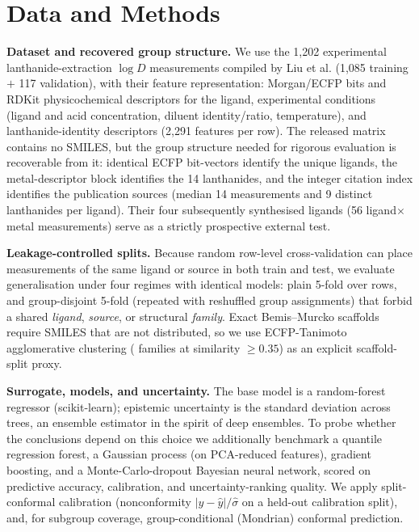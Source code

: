 \documentclass[journal=acsodf,manuscript=article]{achemso}
\begin{document}
\section{Data and Methods}
\textbf{Dataset and recovered group structure.} We use the 1{,}202 experimental
lanthanide-extraction $\log D$ measurements compiled by Liu et
al.\cite{Liu_2022} (1{,}085 training $+$ 117 validation), with their feature
representation: Morgan/ECFP bits and RDKit physicochemical descriptors for the
ligand, experimental conditions (ligand and acid concentration, diluent
identity/ratio, temperature), and lanthanide-identity descriptors (2{,}291 features
per row). The released matrix contains no SMILES, but the group structure needed for
rigorous evaluation is recoverable from it: identical ECFP bit-vectors identify the
\nLigands{} unique ligands, the metal-descriptor block identifies the 14 lanthanides,
and the integer citation index identifies the \nSources{} publication sources (median
14 measurements and 9 distinct lanthanides per ligand). Their four subsequently
synthesised ligands (56 ligand$\times$metal measurements) serve as a strictly
prospective external test.

\textbf{Leakage-controlled splits.} Because random row-level cross-validation can
place measurements of the same ligand or source in both train and test, we evaluate
generalisation under four regimes with identical models: plain 5-fold over rows, and
group-disjoint 5-fold (repeated with reshuffled group assignments) that forbid a
shared \emph{ligand}, \emph{source}, or structural \emph{family}. Exact Bemis--Murcko
scaffolds require SMILES that are not distributed, so we use ECFP-Tanimoto
agglomerative clustering (\nFamilies{} families at similarity $\ge 0.35$) as an
explicit scaffold-split proxy.

\textbf{Surrogate, models, and uncertainty.} The base model is a random-forest
regressor\cite{Breiman_2001} (scikit-learn\cite{Pedregosa_2011}); epistemic
uncertainty is the standard deviation across trees, an ensemble estimator in the
spirit of deep ensembles.\cite{Lakshminarayanan_2017,Scalia_2020,Hirschfeld_2020} To
probe whether the conclusions depend on this choice we additionally benchmark a
quantile regression forest, a Gaussian process (on PCA-reduced features), gradient
boosting, and a Monte-Carlo-dropout Bayesian neural
network,\cite{Gal_2016,Soleimany_2021,Busk_2022} scored on predictive accuracy,
calibration, and uncertainty-ranking quality. We apply split-conformal
calibration\cite{Vovk_2005,Lei_2018,Angelopoulos_2023} (nonconformity
$|y-\hat{y}|/\hat\sigma$ on a held-out calibration split), and, for subgroup
coverage, group-conditional (Mondrian) conformal prediction.\cite{Sun_2017}
\end{document}
